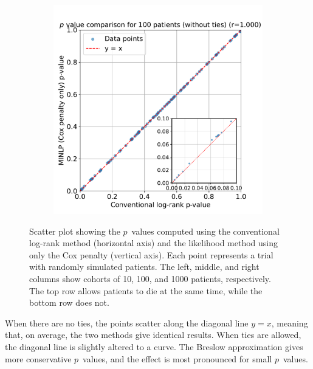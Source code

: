 \documentclass[article]{jss}
\begin{document}
\begin{figure}[ht]
\begin{subfigure}[t]{0.32\textwidth}
  \caption{\label{fig:compare-p-value-10-patients-no-ties}}
\end{subfigure}
\begin{subfigure}[t]{0.32\textwidth}
  \centering
  \includegraphics[width=\linewidth]{p_value_comparison_100_patients_no_ties.pdf}
  \caption{\label{fig:compare-p-value-100-patients-no-ties}}
\end{subfigure}
\begin{subfigure}[t]{0.32\textwidth}
  \centering
  \mbox{} %
\end{subfigure}
\caption{\label{fig:compare-p-value} Scatter plot showing the \(p\)~values computed using the conventional log-rank method (horizontal axis) and the likelihood method using only the Cox penalty (vertical axis). Each point represents a trial with randomly simulated patients. The left, middle, and right columns show cohorts of 10, 100, and 1000 patients, respectively. The top row allows patients to die at the same time, while the bottom row does not.}
\end{figure}

When there are no ties, the points scatter along the diagonal line \(y=x\), meaning that, on average, the two methods give identical results. When ties are allowed, the diagonal line is slightly altered to a curve. The Breslow approximation gives more conservative \(p\)~values, and the effect is most pronounced for small \(p\)~values.
\end{document}
